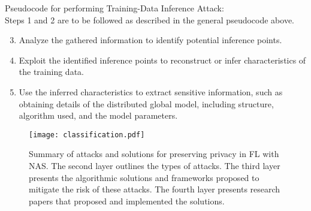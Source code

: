 \documentclass[conference]{IEEEtran}
\begin{document}
Pseudocode for performing Training-Data Inference Attack:\\
Steps 1 and 2 are to be followed as described in the general pseudocode above.
\begin{enumerate}
  \setcounter{enumi}{2}
\item Analyze the gathered information to identify potential inference points.
\item Exploit the identified inference points to reconstruct or infer characteristics of the training data.
\item Use the inferred characteristics to extract sensitive information, such as obtaining details of the distributed global model, including structure, algorithm used, and the model parameters.
\end{enumerate} 

  
\begin{figure*}[ht!] %
\centering
\texttt{[image: classification.pdf]} %
\caption{Summary of attacks and solutions for preserving privacy in FL with NAS. The second layer outlines the types of attacks. The third layer presents the algorithmic solutions and frameworks proposed to mitigate the risk of these attacks. The fourth layer presents research papers that proposed and implemented the solutions.}
\label{fig: summary} %
\end{figure*}
\end{document}
